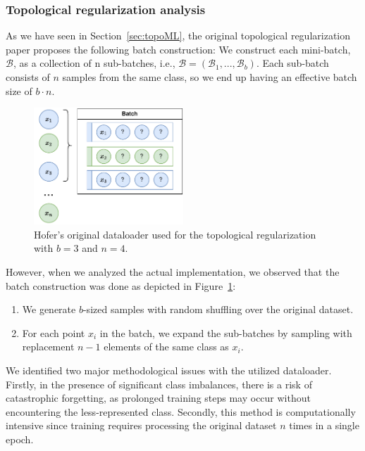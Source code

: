 \documentclass[../main.tex]{subfiles}
\begin{document}
\subsubsection*{Topological regularization analysis}

As we have seen in Section~\ref{sec:topoML}, the original topological regularization paper proposes the following batch construction: We construct each mini-batch, $\mathcal{B}$, as a collection of n sub-batches, i.e., $\mathcal{B} = (\mathcal{B}_1, . . . , \mathcal{B}_b)$. Each sub-batch consists of $n$ samples from the same class, so we end up having an effective batch size of $b\cdot n$.

\begin{figure}[!ht]
    \centering
    \includegraphics[width=0.5\textwidth]{figures/mt/hoferData.pdf} 
    \caption{Hofer's original dataloader used for the topological regularization with $b=3$ and $n=4$.}
    \label{fig:hoferData}
\end{figure}


However, when we analyzed the actual implementation, we observed that the batch construction was done as depicted in Figure~\ref{fig:hoferData}:
\begin{enumerate}
    \item We generate $b$-sized samples with random shuffling over the original dataset.
    \item For each point $x_i$ in the batch, we expand the sub-batches by sampling with replacement $n-1$ elements of the same class as $x_i$. 
\end{enumerate}  


We identified two major methodological issues with the utilized dataloader. Firstly, in the presence of significant class imbalances, there is a risk of catastrophic forgetting, as prolonged training steps may occur without encountering the less-represented class. Secondly, this method is computationally intensive since training requires processing the original dataset $n$ times in a single epoch.\\
\end{document}
